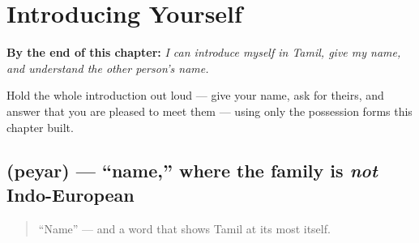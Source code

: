
\chapter{Introducing Yourself}
\label{ch:introductions}

\begin{chapteropening}
\textbf{By the end of this chapter:} \emph{I can introduce myself in Tamil, give my name, and understand the other person's name.}

Hold the whole introduction out loud — give your name, ask for theirs, and answer that you are pleased to meet them — using only the possession forms this chapter built.
\end{chapteropening}

\section[\texorpdfstring{\ta{பெயர்} (peyar)}{பெயர் (peyar)}]{ (peyar) — \textquotedblleft{}name,\textquotedblright{} where the family is \emph{not} Indo-European}

\label{lesson:TA-C02-peyar}



\begin{quote}
\textquotedblleft{}Name\textquotedblright{} — and a word that shows Tamil at its most itself.
\end{quote}

